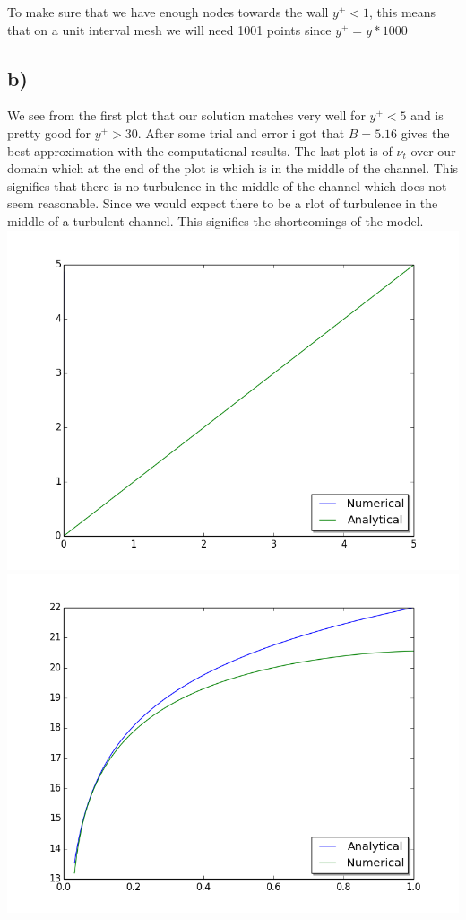 \documentclass[a4paper,norsk]{article}
\begin{document}
To make sure that we have enough nodes towards the wall $y^+ < 1$, this means that on a unit interval mesh we will need 1001 points since $ y^+ = y*1000$ 

\subsection*{b)}
We see from the first plot that our solution matches very well for $y^+<5$ and is pretty good for $y^+>30$. After some trial and error i got that $B = 5.16$ gives the best approximation with the computational results. \newline
The last plot is of $\nu_t$ over our domain which at the end of the plot is which is in the middle of the channel. This signifies that there is no turbulence in the middle of the channel which does not seem reasonable. Since we would expect there to be a rlot of turbulence in the middle of a turbulent channel. This signifies the shortcomings of the model. \newline
\includegraphics[trim = 0mm 0mm 0mm 0mm, clip, scale=0.3]{error_5.png} 
\includegraphics[trim = 0mm 0mm 0mm 0mm, clip, scale=0.3]{error_30.png} 
\end{document}
